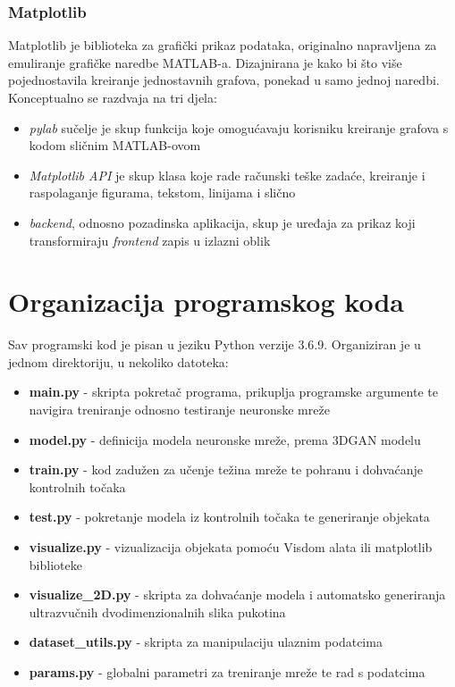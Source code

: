 \documentclass[times, utf8, diplomski]{fer}
\begin{document}
\subsubsection{Matplotlib}
Matplotlib je biblioteka za grafički prikaz podataka, originalno napravljena za emuliranje grafičke naredbe MATLAB-a. Dizajnirana je kako bi što više pojednostavila kreiranje jednostavnih grafova, ponekad u samo jednoj naredbi. Konceptualno se razdvaja na tri djela:
\begin{itemize}
    \item \textit{pylab} sučelje je skup funkcija koje omogućavaju korisniku kreiranje grafova s kodom sličnim MATLAB-ovom
    \item \textit{Matplotlib API} je skup klasa koje rade računski teške zadaće, kreiranje i raspolaganje figurama, tekstom, linijama i slično
    \item \textit{backend}, odnosno pozadinska aplikacija, skup je uređaja za prikaz koji transformiraju \textit{frontend} zapis u izlazni oblik
    \cite{matplotlib}
\end{itemize}

\break

\section{Organizacija programskog koda}
Sav programski kod je pisan u jeziku Python verzije 3.6.9. Organiziran je u jednom direktoriju, u nekoliko datoteka:
\begin{itemize}
    \item \textbf{main.py} - skripta pokretač programa, prikuplja programske argumente te navigira treniranje odnosno testiranje neuronske mreže
    \item \textbf{model.py} - definicija modela neuronske mreže, prema 3DGAN modelu
    \item \textbf{train.py} - kod zadužen za učenje težina mreže te pohranu i dohvaćanje kontrolnih točaka
    \item \textbf{test.py} - pokretanje modela iz kontrolnih točaka te generiranje objekata
    \item \textbf{visualize.py} - vizualizacija objekata pomoću Visdom alata ili matplotlib biblioteke
    \item \textbf{visualize\_2D.py} - skripta za dohvaćanje modela i automatsko generiranja ultrazvučnih dvodimenzionalnih slika pukotina
    \item \textbf{dataset\_utils.py} - skripta za manipulaciju ulaznim podatcima
    \item \textbf{params.py} - globalni parametri za treniranje mreže te rad s podatcima
\end{itemize}
\end{document}
